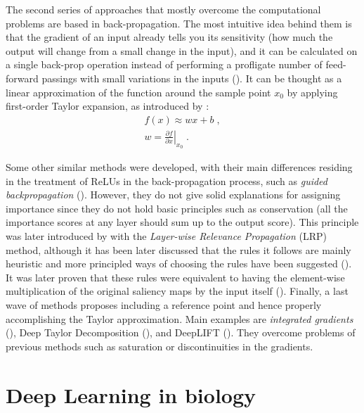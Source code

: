The second series of approaches that mostly overcome the computational problems are based in back-propagation. The most intuitive idea behind them is that the gradient of an input already tells you its sensitivity (how much the output will change from a small change in the input), and it can be calculated on a single back-prop operation instead of performing a profligate number of feed-forward passings with small variations in the inputs (\cite{Shrikumar2017}). It can be thought as a linear approximation of the function around the sample point $x_0$ by applying first-order Taylor expansion, as introduced by \cite{Simonyan2014}:
\begin{align}
f(x) \approx w x + b \; , \nonumber \\
w = \left. \frac{\partial f}{\partial x} \right|_{x_0} \; .
\end{align}

Some other similar methods were developed, with their main differences residing in the treatment of ReLUs in the back-propagation process, such as \textit{guided backpropagation} (\cite{Springenberg2014}). However, they do not give solid explanations for assigning importance since they do not hold basic principles such as conservation (all the importance scores at any layer should sum up to the output score). This principle was later introduced by \cite{Bach2015} with the \textit{Layer-wise Relevance Propagation} (LRP) method, although it has been later discussed that the rules it follows are mainly heuristic and more principled ways of choosing the rules have been suggested (\cite{Montavon2017}). It was later proven that these rules were equivalent to having the element-wise multiplication of the original saliency maps by the input itself (\cite{Shrikumar2016}). Finally, a last wave of methods proposes including a reference point and hence properly accomplishing the Taylor approximation. Main examples are \textit{integrated gradients} (\cite{Sundararajan2017}), Deep Taylor Decomposition (\cite{Montavon2017}), and DeepLIFT (\cite{Shrikumar2017}). They overcome problems of previous methods such as saturation or discontinuities in the gradients.

\section{Deep Learning in biology}

